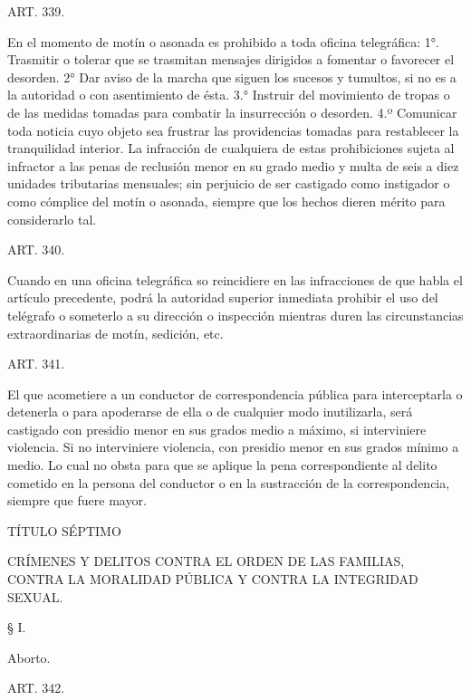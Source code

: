     ART. 339.
   
    En el momento de motín o asonada es prohibido a toda oficina telegráfica:
    1°. Trasmitir o tolerar que se trasmitan mensajes dirigidos a fomentar o favorecer el desorden.
    2°  Dar aviso de la marcha que siguen los sucesos y tumultos, si no es a la autoridad o con asentimiento de ésta.
    3.° Instruir del movimiento de tropas o de las medidas tomadas para combatir la insurrección o desorden.
    4.º Comunicar toda noticia cuyo objeto sea frustrar las providencias tomadas para restablecer la tranquilidad interior.
    La infracción de cualquiera de estas prohibiciones sujeta al infractor a las penas de reclusión menor en su grado medio y multa de seis a diez unidades tributarias mensuales; sin perjuicio de ser castigado como instigador o como cómplice del motín o asonada, siempre que los hechos dieren mérito para considerarlo tal.






    ART. 340.

    Cuando en una oficina telegráfica so reincidiere en las infracciones de que habla el artículo precedente, podrá la autoridad superior inmediata prohibir el uso del telégrafo o someterlo a su dirección o inspección mientras duren las circunstancias extraordinarias de motín, sedición, etc.


    ART. 341.

    El que acometiere a un conductor de correspondencia pública para interceptarla o detenerla o para apoderarse de ella o de cualquier modo inutilizarla, será castigado con presidio menor en sus grados medio a máximo, si interviniere violencia. Si no interviniere violencia, con presidio menor en sus grados mínimo a medio.
    Lo cual no obsta para que se aplique la pena correspondiente al delito cometido en la persona del conductor o en la sustracción de la correspondencia, siempre que fuere mayor.



   
    TÍTULO SÉPTIMO

    CRÍMENES Y DELITOS CONTRA EL ORDEN DE LAS FAMILIAS, CONTRA LA MORALIDAD PÚBLICA Y CONTRA LA INTEGRIDAD SEXUAL.









    § I.

    Aborto.


    ART. 342.

